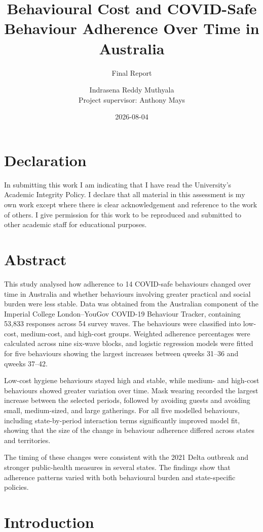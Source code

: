 \documentclass[
  12pt,
  a4paper,
]{article}
\title{Behavioural Cost and COVID-Safe Behaviour Adherence Over Time in Australia}
\subtitle{Final Report}
\author{Indrasena Reddy Muthyala\\
\vspace{0.3cm}
Project supervisor: Anthony Mays}
\date{2026-08-04}
\begin{document}
\maketitle

\section{Declaration}\label{declaration}

In submitting this work I am indicating that I have read the
University's Academic Integrity Policy. I declare that all material in
this assessment is my own work except where there is clear
acknowledgement and reference to the work of others. I give permission
for this work to be reproduced and submitted to other academic staff for
educational purposes.

\section{Abstract}\label{abstract}

This study analysed how adherence to 14 COVID-safe behaviours changed
over time in Australia and whether behaviours involving greater
practical and social burden were less stable. Data was obtained from
the Australian component of the Imperial College London--YouGov COVID-19
Behaviour Tracker, containing 53,833 responses across 54 survey waves.
The behaviours were classified into low-cost, medium-cost, and high-cost groups.
Weighted adherence percentages were calculated across nine six-wave
blocks, and logistic regression models were fitted for five behaviours
showing the largest increases between qweeks 31--36 and qweeks 37--42.

Low-cost hygiene behaviours stayed high and stable,
while medium- and high-cost behaviours showed greater variation over
time. Mask wearing recorded the largest increase between the selected
periods, followed by avoiding guests and avoiding small, medium-sized,
and large gatherings. For all five modelled behaviours, including
state-by-period interaction terms significantly improved model fit,
showing that the size of the change in behaviour adherence differed across states and
territories.

The timing of these changes were consistent with the 2021 Delta outbreak
and stronger public-health measures in several states. The
findings show that adherence patterns varied with both behavioural
burden and state-specific policies.

\section{Introduction}\label{introduction}
\end{document}
